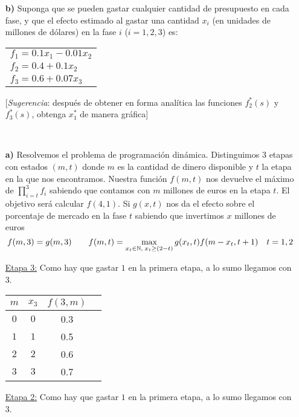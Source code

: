 \documentclass[twoside]{article}
\begin{document}
\begin{ejercicio}{1}
\begin{itemize}
\item[\textbf{b)}] Suponga que se pueden gastar cualquier cantidad de presupuesto en cada fase, y que el efecto estimado al gastar una cantidad $x_i$ (en unidades de millones de dólares) en la fase $i$ ($i=1,2,3$) es:

\begin{tabular}{l}
$f_1=0.1x_1-0.01x_2$\\
$f_2=0.4+0.1x_2$\\
$f_3=0.6+0.07x_3$
\end{tabular}

[\emph{Sugerencia}: después de obtener en forma analítica las funciones $f_2^*(s)$ y $f_3^*(s)$, obtenga $x_1^*$ de manera gráfica]
\end{itemize}
\end{ejercicio}
\begin{solucion}
\
\begin{itemize}
\item[\textbf{a)}] 
Resolvemos el problema de programación dinámica. Distinguimos $3$ etapas con estados $(m,t)$ donde $m$ es la cantidad de dinero disponible y $t$ la etapa en la que nos encontramos. Nuestra función $f(m,t)$ nos devuelve el máximo de $\prod_{i=t}^3 f_i$ sabiendo que contamos con $m$ millones de euros en la etapa $t$. El objetivo será calcular $f(4,1)$. Si $g(x,t)$ nos da el efecto sobre el porcentaje de mercado en la fase $t$ sabiendo que invertimos $x$ millones de euros
$$
f(m,3) = g(m,3) \qquad f(m,t) = \max_{x_t\in\mathbb{N},\;x_t\geq (2-t)} g(x_t,t)f(m-x_t,t+1) \quad t=1,2
$$

\underline{Etapa 3:} Como hay que gastar $1$ en la primera etapa, a lo sumo llegamos con $3$.
\begin{center}
\begin{tabular}{|c| c| c| c |}
\hline
$m$ & $x_3$ & $f(3,m)$ \\
\hline
$0$ & $0$ & 0.3   \\
\hline         
$1$ & $1$ & 0.5 \\
\hline        
$2$ & $2$ & 0.6  \\
\hline
$3$ & $3$  & 0.7   \\
\hline
\end{tabular}
\end{center}
\underline{Etapa 2:} Como hay que gastar $1$ en la primera etapa, a lo sumo llegamos con $3$.


\end{itemize}
\end{solucion}
\end{document}
